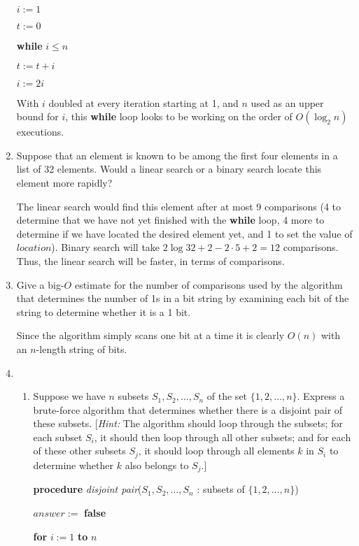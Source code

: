 \documentclass[11pt]{article}
\begin{document}
\begin{enumerate}[label=\textbf{\arabic*.}]
	$i := 1$
	
	$t := 0$
	
	\textbf{while} $i \leq n$
	
	\qquad $t := t + i$
	
	\qquad $i := 2i$
	
	With $i$ doubled at every iteration starting at 1, and $n$ used as an upper bound for $i$, this \textbf{while} loop looks to be working on the order of $O(\log_2 n)$ executions.
	
	\item Suppose that an element is known to be among the first four elements in a list of 32 elements. Would a linear search or a binary search locate this element more rapidly?
	
	The linear search would find this element after at most 9 comparisons (4 to determine that we have not yet finished with the \textbf{while} loop, 4 more to determine if we have located the desired element yet, and 1 to set the value of $location$). Binary search will take $2 \log 32 + 2 - 2 \cdot 5 + 2 = 12$ comparisons. Thus, the linear search will be faster, in terms of comparisons.
	
	\item Give a big-$O$ estimate for the number of comparisons used by the algorithm that determines the number of 1s in a bit string by examining each bit of the string to determine whether it is a 1 bit.
	
	Since the algorithm simply scans one bit at a time it is clearly $O(n)$ with an $n$-length string of bits.
	
	\item \begin{enumerate}[label=\textbf{\alph*)}]
		\item Suppose we have $n$ subsets $S_1, S_2, \ldots, S_n$ of the set $\{1, 2, \ldots, n\}$. Express a brute-force algorithm that determines whether there is a disjoint pair of these subsets. [\emph{Hint:} The algorithm should loop through the subsets; for each subset $S_i$, it should then loop through all other subsets; and for each of these other subsets $S_j$, it should loop through all elements $k$ in $S_i$ to determine whether $k$ also belongs to $S_j$.]
		
		\textbf{procedure} \emph{disjoint pair}($S_1, S_2, \ldots, S_n$ : subsets of $\{1, 2, \ldots, n\}$)
		
		$answer :=$ \textbf{false}
		
		\textbf{for} $i := 1$ \textbf{to} $n$
		

\end{enumerate}
\end{enumerate}
\end{document}
